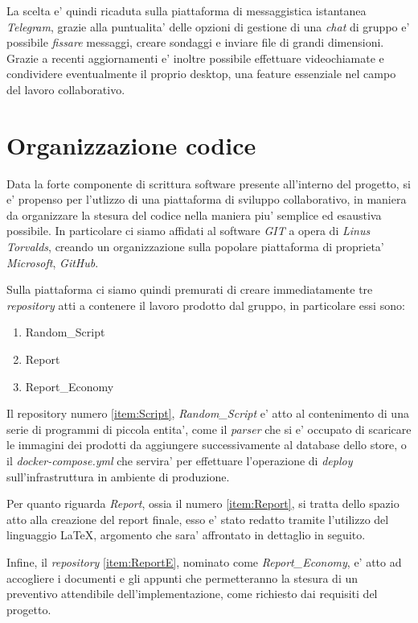 \documentclass[a4paper]{report}
\begin{document}
		La scelta e' quindi ricaduta sulla piattaforma di messaggistica istantanea \emph{Telegram}, grazie alla
		puntualita' delle opzioni di gestione di una \emph{chat} di gruppo e' possibile \emph{fissare} messaggi, creare
		sondaggi e inviare file di grandi dimensioni. Grazie a recenti aggiornamenti e' inoltre possibile effettuare
		videochiamate e condividere eventualmente il proprio desktop, una feature essenziale nel campo del lavoro
		collaborativo.
	\section{Organizzazione codice} \label{organizzazione codice}
		Data la forte componente di scrittura software presente all'interno del progetto, si e' propenso per l'utlizzo
		di una piattaforma di sviluppo collaborativo, in maniera da organizzare la stesura del codice nella maniera piu'
		semplice ed esaustiva possibile. In particolare ci siamo affidati al software \emph{GIT} a opera di \emph{Linus
		Torvalds}, creando un organizzazione sulla popolare piattaforma di proprieta' \emph{Microsoft}, \emph{GitHub}.

		Sulla piattaforma ci siamo quindi premurati di creare immediatamente tre \emph{repository} atti a contenere il
		lavoro prodotto dal gruppo, in particolare essi sono:
		\begin{enumerate}
			\item Random\_Script\label{item:Script}
			\item Report\label{item:Report}
			\item Report\_Economy\label{item:ReportE}
		\end{enumerate}

		Il repository numero \ref{item:Script}{, \emph{Random\_Script}} e' atto al contenimento di una serie di
		programmi di piccola entita', come il \emph{parser} che si e' occupato di scaricare le immagini dei prodotti da
		aggiungere successivamente al database dello store, o il \emph{docker-compose.yml} che servira' per effettuare l'operazione di \emph{deploy} sull'infrastruttura in ambiente di produzione.

		Per quanto riguarda \emph{Report}, ossia il numero \ref{item:Report}, si tratta dello spazio atto alla creazione
		del report finale, esso e' stato redatto tramite l'utilizzo del linguaggio \LaTeX{}, argomento che sara'
		affrontato in dettaglio in seguito.

		Infine, il \emph{repository} \ref{item:ReportE}, nominato come \emph{Report\_Economy}, e' atto ad accogliere i
		documenti e gli appunti che permetteranno la stesura di un preventivo attendibile dell'implementazione, come
		richiesto dai requisiti del progetto.
\end{document}
